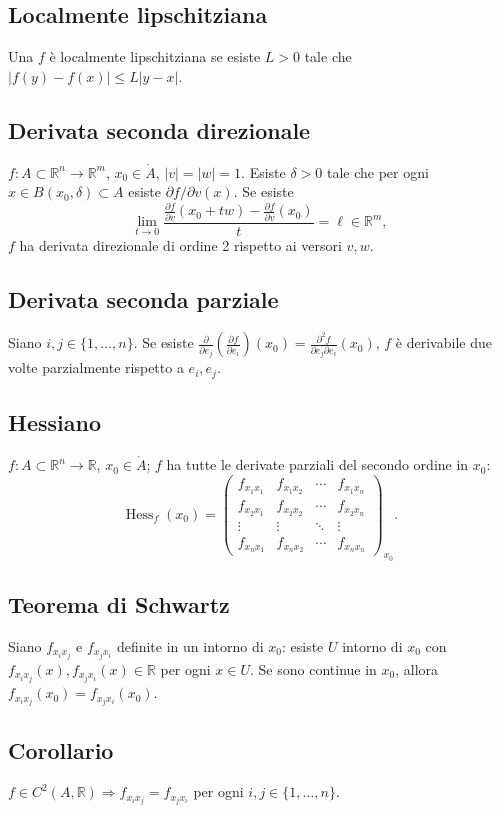\documentclass[11pt,a4paper]{article}
\newcommand{\R}{\mathbb R}\newcommand{\N}{\mathbb N}\newcommand{\pagina}[1]{\clearpage}
\begin{document}
\subsection*{Localmente lipschitziana}
Una $f$ è localmente lipschitziana se esiste $L>0$ tale che $|f(y)-f(x)|\le L|y-x|$.
\pagina{28}
\subsection*{Derivata seconda direzionale}
$f:A\subset\R^n\to\R^m$, $x_0\in\mathring A$, $|v|=|w|=1$. Esiste $\delta>0$ tale che per ogni $x\in B(x_0,\delta)\subset A$ esiste $\partial f/\partial v(x)$. Se esiste
\[\lim_{t\to0}\frac{\frac{\partial f}{\partial v}(x_0+tw)-\frac{\partial f}{\partial v}(x_0)}t=\ell\in\R^m,\]
$f$ ha derivata direzionale di ordine 2 rispetto ai versori $v,w$.
\subsection*{Derivata seconda parziale}
Siano $i,j\in\{1,\ldots,n\}$. Se esiste $\frac{\partial}{\partial e_j}(\frac{\partial f}{\partial e_i})(x_0)=\frac{\partial^2f}{\partial e_j\partial e_i}(x_0)$, $f$ è derivabile due volte parzialmente rispetto a $e_i,e_j$.
\subsection*{Hessiano}
$f:A\subset\R^n\to\R$, $x_0\in\mathring A$; $f$ ha tutte le derivate parziali del secondo ordine in $x_0$:
\[\operatorname{Hess}_f(x_0)=\begin{pmatrix}f_{x_1x_1}&f_{x_1x_2}&\cdots&f_{x_1x_n}\\f_{x_2x_1}&f_{x_2x_2}&\cdots&f_{x_2x_n}\\\vdots&\vdots&\ddots&\vdots\\f_{x_nx_1}&f_{x_nx_2}&\cdots&f_{x_nx_n}\end{pmatrix}_{x_0}.\]
\subsection*{Teorema di Schwartz}
Siano $f_{x_ix_j}$ e $f_{x_jx_i}$ definite in un intorno di $x_0$: esiste $U$ intorno di $x_0$ con $f_{x_ix_j}(x),f_{x_jx_i}(x)\in\R$ per ogni $x\in U$. Se sono continue in $x_0$, allora $f_{x_ix_j}(x_0)=f_{x_jx_i}(x_0)$.
\pagina{29}
\subsection*{Corollario}
$f\in C^2(A,\R)\Rightarrow f_{x_ix_j}=f_{x_jx_i}$ per ogni $i,j\in\{1,\ldots,n\}$.
\end{document}
